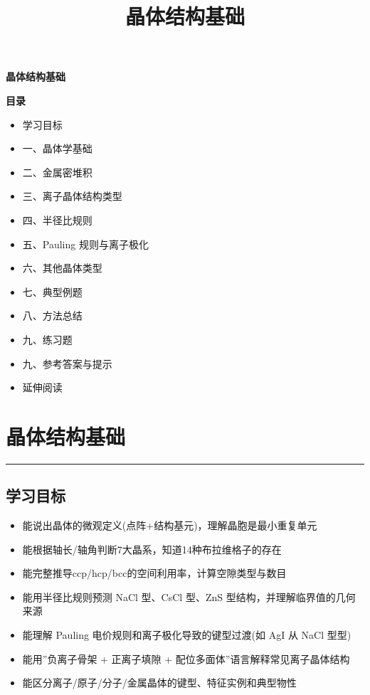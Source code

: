 \documentclass[a4paper,11pt]{ctexart}
\title{晶体结构基础}
\date{}
\providecommand{\tightlist}{\setlength{\itemsep}{0pt}\setlength{\parskip}{0pt}}
\newcommand{\箭}{\ensuremath{\rightarrow}}
\newcommand{\左箭}{\ensuremath{\leftarrow}}
\newcommand{\上箭}{\ensuremath{\uparrow}}
\newcommand{\下箭}{\ensuremath{\downarrow}}
\newcommand{\衡}{\ensuremath{\rightleftharpoons}}
\newcommand{\双箭}{\ensuremath{\leftrightarrow}}
\newcommand{\约等于}{\ensuremath{\approx}}
\newcommand{\小于等于}{\ensuremath{\leq}}
\newcommand{\大于等于}{\ensuremath{\geq}}
\newcommand{\不等于}{\ensuremath{\neq}}
\newcommand{\西格马}{\ensuremath{\sigma}}
\newcommand{\派}{\ensuremath{\pi}}
\begin{document}
\thispagestyle{plain}
\begin{center}
{\bfseries 晶体结构基础\par}
\end{center}
\vspace{1em}
{\large\bfseries 目录\par}
\vspace{0.6em}
\begin{itemize}[leftmargin=1.6em,label={},itemsep=0.3em,topsep=0.2em]
\item 学习目标
\item 一、晶体学基础
\item 二、金属密堆积
\item 三、离子晶体结构类型
\item 四、半径比规则
\item 五、Pauling 规则与离子极化
\item 六、其他晶体类型
\item 七、典型例题
\item 八、方法总结
\item 九、练习题
\item 九、参考答案与提示
\item 延伸阅读
\end{itemize}
\vspace{0.4em}
\newpage
\section{晶体结构基础}\label{ux6676ux4f53ux7ed3ux6784ux57faux7840}

\begin{center}\rule{0.5\linewidth}{0.5pt}\end{center}

\subsection{学习目标}\label{ux5b66ux4e60ux76eeux6807}

\begin{itemize}
\tightlist
\item
  能说出晶体的微观定义(点阵+结构基元)，理解晶胞是最小重复单元
\item
  能根据轴长/轴角判断7大晶系，知道14种布拉维格子的存在
\item
  能完整推导ccp/hcp/bcc的空间利用率，计算空隙类型与数目
\item
  能用半径比规则预测 NaCl 型、CsCl 型、ZnS 型结构，并理解临界值的几何来源
\item
  能理解 Pauling 电价规则和离子极化导致的键型过渡(如 AgI 从 NaCl 型 型)
\item
  能用''负离子骨架 + 正离子填隙 + 配位多面体''语言解释常见离子晶体结构
\item
  能区分离子/原子/分子/金属晶体的键型、特征实例和典型物性
\end{itemize}
\end{document}

